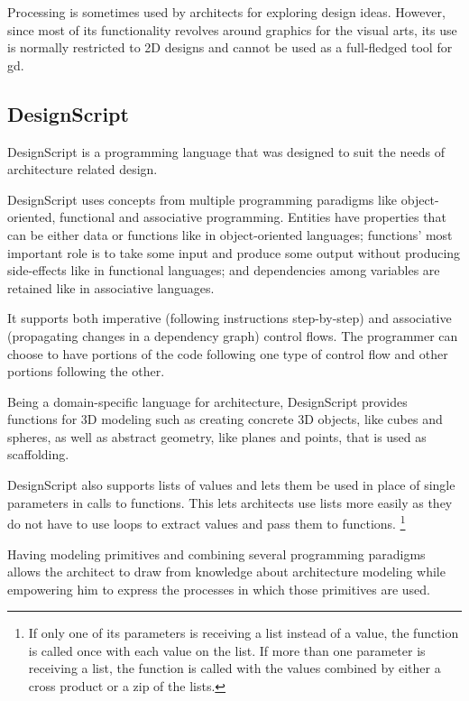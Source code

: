 Processing is sometimes used by architects for exploring design ideas.
However, since most of its functionality revolves around graphics for the visual arts, its use is normally restricted to 2D designs and cannot be used as a full-fledged tool for \gls{gd}.


\subsection{DesignScript}
\label{section:designscript:related}
DesignScript\cite{aish2012designscript} is a programming language that was designed to suit the needs of architecture related design.

DesignScript uses concepts from multiple programming paradigms like object-oriented, functional and associative programming.
Entities have properties that can be either data or functions like in object-oriented languages; functions' most important role is to take some input and produce some output without producing side-effects like in functional languages; and dependencies among variables are retained like in associative languages.

It supports both imperative (following instructions step-by-step) and associative (propagating changes in a dependency graph) control flows.
The programmer can choose to have portions of the code following one type of control flow and other portions following the other.

Being a domain-specific language for architecture, DesignScript provides functions for 3D modeling such as creating concrete 3D objects, like cubes and spheres, as well as abstract geometry, like planes and points, that is used as scaffolding.

DesignScript also supports lists of values and lets them be used in place of single parameters in calls to functions.
This lets architects use lists more easily as they do not have to use loops to extract values and pass them to functions.%
\footnote{If only one of its parameters is receiving a list instead of a value, the function is called once with each value on the list.
If more than one parameter is receiving a list, the function is called with the values combined by either a cross product or a zip of the lists.}

Having modeling primitives and combining several programming paradigms allows the architect to draw from knowledge about architecture modeling while empowering him to express the processes in which those primitives are used.

